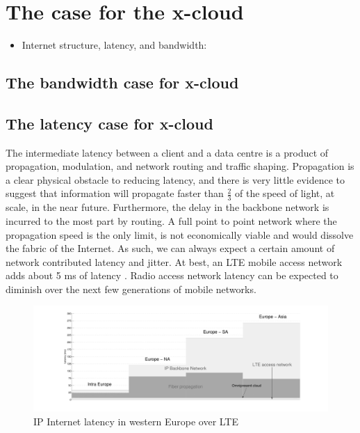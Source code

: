 \documentclass[conference]{IEEEtran}
\newcommand{\xcloud}{x-cloud }
\begin{document}
\section{The case for the \xcloud}

\begin{itemize}
\item Internet structure, latency, and bandwidth: \cite{Ramasubramanian:2009:TIL:2492101.1555357}
\end{itemize}

\subsection{The bandwidth case for \xcloud}

\subsection{The latency case for \xcloud}
The intermediate latency between a client and a data centre is a product of propagation, modulation, and network routing and traffic shaping. Propagation is a clear physical obstacle to reducing latency, and there is very little evidence to suggest that information will propagate faster than $\frac{2}{3}$ of the speed of light, at scale, in the near future. Furthermore, the delay in the backbone network is incurred to the most part by routing. A full point to point network where the propagation speed is the only limit, is not economically viable and would dissolve the fabric of the Internet. As such, we can always expect a certain amount of network contributed latency and jitter. At best, an LTE mobile access network adds about 5 ms of latency \cite{blajic2006latency}. Radio access network latency can be expected to diminish over the next few generations of mobile networks. 

\begin{figure}[tb]
	\centering
	\includegraphics[height=0.12\paperheight]{omni_motivation.pdf} 
	\caption{IP Internet latency in western Europe \cite{BT_IP} over LTE \cite{blajic2006latency}}
	\label{fig:omni_motivation}
\end{figure}
\end{document}
